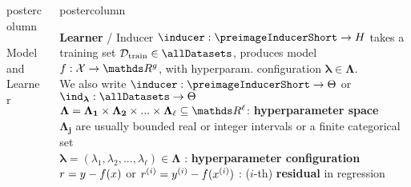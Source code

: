 \documentclass{beamer}
\newlength{\columnheight} %
\begin{document}
\begin{frame}[fragile]{}
\begin{columns}
\begin{column}{.31\textwidth}
\begin{beamercolorbox}[center]{postercolumn}
\begin{minipage}{.98\textwidth}
{\begin{myblock}{Model and Learner}
\end{myblock}\vfill
				}
			\end{minipage}
		\end{beamercolorbox}
	\end{column}
	\begin{column}{.31\textwidth}
		\begin{beamercolorbox}[center]{postercolumn}
			\begin{minipage}{.98\textwidth}
				\parbox[t][\columnheight]{\textwidth}{
\begin{myblock}{} \vspace{-4ex}

\textbf{Learner} / Inducer $\inducer: \preimageInducerShort \rightarrow \Hspace$  takes a training set  $\Dtrain \in \allDatasets$, produces model $f : \Xspace \rightarrow \R^g$, with hyperparam. configuration $\bm{\lambda} \in \bm{\Lambda}$.\\
We also write $\inducer: \preimageInducerShort \rightarrow \Theta$ or $\ind_{\bm{\lambda} }: \allDatasets \rightarrow \Theta$ \\

$\bm{\Lambda} = \bm{\Lambda_1} \times \bm{\Lambda_2} \times ... \times \bm{\Lambda_}{\ell} \subseteq \R^{\ell}$: %
\textbf{hyperparameter space} \\
$\bm{\Lambda_j} $ are usually bounded real or integer intervals or a finite categorical set\\

$\bm{\lambda} = (\lambda_1, \lambda_2, ..., \lambda_{\ell}) \in \bm{\Lambda}$ : \textbf{hyperparameter configuration} \\




$r = y - f(x)$ or $r^{(i)} = y^{(i)} - f(x^{(i)})$ : ($i$-th) \textbf{residual} in regression\\


\end{myblock}}
\end{minipage}
\end{beamercolorbox}
\end{column}
\end{columns}
\end{frame}
\end{document}

